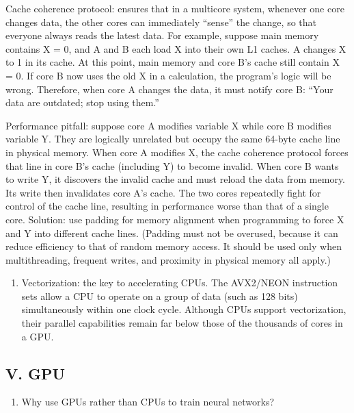 Cache coherence protocol: ensures that in a multicore system, whenever one core changes data, the other cores can immediately ``sense'' the change, so that everyone always reads the latest data. For example, suppose main memory contains X = 0, and A and B each load X into their own L1 caches. A changes X to 1 in its cache. At this point, main memory and core B's cache still contain X = 0. If core B now uses the old X in a calculation, the program's logic will be wrong. Therefore, when core A changes the data, it must notify core B: ``Your data are outdated; stop using them.''

Performance pitfall: suppose core A modifies variable X while core B modifies variable Y. They are logically unrelated but occupy the same 64-byte cache line in physical memory. When core A modifies X, the cache coherence protocol forces that line in core B's cache (including Y) to become invalid. When core B wants to write Y, it discovers the invalid cache and must reload the data from memory. Its write then invalidates core A's cache. The two cores repeatedly fight for control of the cache line, resulting in performance worse than that of a single core. Solution: use padding for memory alignment when programming to force X and Y into different cache lines. (Padding must not be overused, because it can reduce efficiency to that of random memory access. It should be used only when multithreading, frequent writes, and proximity in physical memory all apply.)

\begin{enumerate}
\def\labelenumi{\arabic{enumi}.}
\setcounter{enumi}{1}
\tightlist
\item
  Vectorization: the key to accelerating CPUs. The AVX2/NEON instruction sets allow a CPU to operate on a group of data (such as 128 bits) simultaneously within one clock cycle. Although CPUs support vectorization, their parallel capabilities remain far below those of the thousands of cores in a GPU.
\end{enumerate}

\hypertarget{v.-gpu}{%
\subsection{V. GPU}\label{v.-gpu}}

\begin{enumerate}
\def\labelenumi{\arabic{enumi}.}
\tightlist
\item
  Why use GPUs rather than CPUs to train neural networks?
\end{enumerate}

